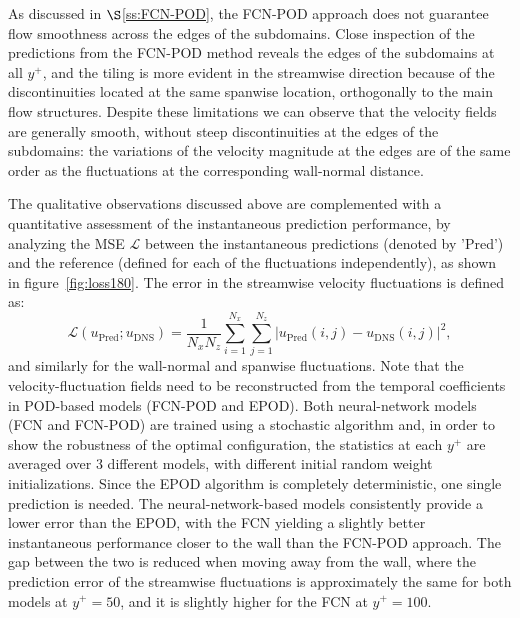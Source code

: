 As discussed in $\S$\ref{ss:FCN-POD}, the FCN-POD approach does not guarantee flow smoothness across the edges of the subdomains.
Close inspection of the predictions from the FCN-POD method reveals the edges of the subdomains at all $y^+$, and the tiling is more evident in the streamwise direction because of the discontinuities located at the same spanwise location, orthogonally to the main flow structures.
Despite these limitations we can observe that the velocity fields are generally smooth, without steep discontinuities at the edges of the subdomains: the variations of the velocity magnitude at the edges are of the same order as the fluctuations at the corresponding wall-normal distance.

The qualitative observations discussed above are complemented with a quantitative assessment of the instantaneous prediction performance, by analyzing the MSE $\mathcal{L}$ between the instantaneous predictions (denoted by 'Pred') and the reference (defined for each of the fluctuations independently), as shown in figure~\ref{fig:loss180}.
The error in the streamwise velocity fluctuations is defined as:
\begin{equation} \label{eq:mse_results}
\mathcal{L}(u_{\mathrm{Pred}};u_{\mathrm{DNS}})=\frac{1}{N_x N_z} \sum_{i=1}^{N_x} \sum_{j=1}^{N_z} \left | u_{\mathrm{Pred}}(i,j) - u_{\mathrm{DNS}}(i,j)\right |^{2},
\end{equation}
\noindent and similarly for the wall-normal and spanwise fluctuations.
Note that the velocity-fluctuation fields need to be reconstructed from the temporal coefficients in POD-based models (FCN-POD and EPOD).
Both neural-network models (FCN and FCN-POD) are trained using a stochastic algorithm and, in order to show the robustness of the optimal configuration, the statistics at each $y^+$ are averaged over 3 different models, with different initial random weight initializations.
Since the EPOD algorithm is completely deterministic, one single prediction is needed.
The neural-network-based models consistently provide a lower error than the EPOD, with the FCN yielding a slightly better instantaneous performance closer to the wall than the FCN-POD approach.
The gap between the two is reduced when moving away from the wall, where the prediction error of the streamwise fluctuations is approximately the same for both models at $y^+=50$, and it is slightly higher for the FCN at $y^+=100$.

